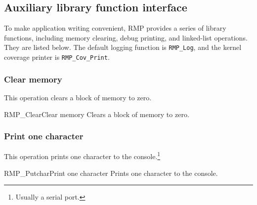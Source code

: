 \subsection{Auxiliary library function interface}

To make application writing convenient, RMP provides a series of library functions, including memory clearing, debug printing, and linked-list operations.
They are listed below.
The default logging function is \texttt{RMP\_Log}, and the kernel coverage printer is \texttt{RMP\_Cov\_Print}.

\subsubsection{Clear memory}

This operation clears a block of memory to zero.

\begin{apidesc}{RMP\_Clear}{Clear memory}\label{api:RMP_Clear}
    Clears a block of memory to zero.
    \begin{apiparams}
    \end{apiparams}
    \begin{apiret}
    \end{apiret}
\end{apidesc}

\subsubsection{Print one character}

This operation prints one character to the console.\footnote{Usually a serial port.}

\begin{apidesc}{RMP\_Putchar}{Print one character}\label{api:RMP_Putchar}
    Prints one character to the console.
    \begin{apiparams}
    \end{apiparams}
    \begin{apiret}
    \end{apiret}
\end{apidesc}

